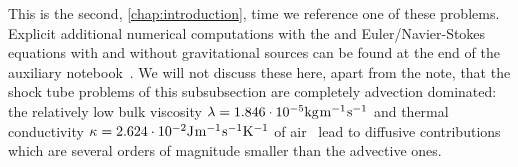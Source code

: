 This is the second, \cf{} \cref{chap:introduction}, time we reference one of these problems.
Explicit additional numerical computations with the \ktScheme{} and Euler/Navier-Stokes equations with and without gravitational sources can be found at the end of the auxiliary notebook~\cite{Steil:2023PhDFVNB}.
We will not discuss these here, apart from the note, that the shock tube problems of this subsubsection are completely advection dominated: the relatively low bulk viscosity $\lambda=1.846\cdot 10^{-5} \mathrm{kg}\mkern1mu\mathrm{m}^{-1}\mkern1mu\mathrm{s}^{-1}$ and thermal conductivity $\kappa=2.624\cdot 10^{-2} \mathrm{J}\mkern1mu\mathrm{m}^{-1}\mkern1mu\mathrm{s}^{-1}\mathrm{K}^{-1}$ of air~\cite{dry-air-properties} lead to diffusive contributions which are several orders of magnitude smaller than the advective ones.